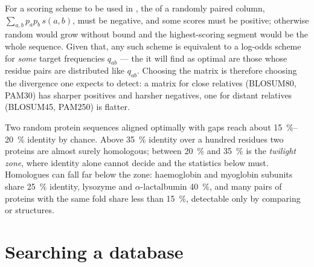 \begin{proposition}\label{prop:b3:bioinformatics:logodds}
For a scoring scheme to be used in , the 
of a randomly paired column, $\sum_{a,b} p_{a} p_{b}\, s(a,b)$, must be
negative, and some scores must be positive; otherwise random
 would grow without bound and the highest-scoring segment
would be the whole sequence. Given that, any such scheme is
equivalent to a log-odds scheme for \emph{some} target frequencies
$q_{ab}$ --- the  it will find as optimal are those whose
residue pairs are distributed like $q_{ab}$. Choosing the matrix is
therefore choosing the divergence one expects to detect: a matrix for
close relatives (BLOSUM80, PAM30) has sharper positives and harsher
negatives, one for distant relatives (BLOSUM45, PAM250) is flatter.
\end{proposition}
\admitted

\begin{example}\label{ex:b3:bioinformatics:twilight}
Two random protein sequences aligned optimally with gaps reach about
\qtyrange{15}{20}{\%} identity by chance. Above \qty{35}{\%} identity
over a hundred residues two proteins are almost surely homologous;
between \qty{20}{\%} and \qty{35}{\%} is the \emph{twilight zone},
where identity alone cannot decide and the statistics below must.
Homologues can fall far below the zone: haemoglobin and myoglobin
subunits share \qty{25}{\%} identity, lysozyme and $\alpha$-lactalbumin
\qty{40}{\%}, and many pairs of proteins with the same fold share less
than \qty{15}{\%}, detectable only by comparing  or structures.
\end{example}

\section{Searching a database}

